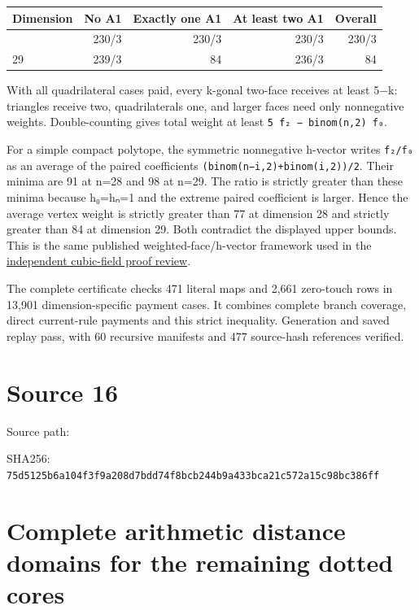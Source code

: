 \documentclass[
  10pt,
]{report}
\newcounter{none} %
\begin{document}
{\def\LTcaptype{none} %
\begin{longtable}[]{@{}lrrrr@{}}
\toprule\noalign{}
Dimension & No A1 & Exactly one A1 & At least two A1 & Overall \\
\midrule\noalign{}
\endhead
\bottomrule\noalign{}
\endlastfoot
28 & 230/3 & 230/3 & 230/3 & 230/3 \\
29 & 239/3 & 84 & 236/3 & 84 \\
\end{longtable}
}

With all quadrilateral cases paid, every k-gonal two-face receives at
least 5−k: triangles receive two, quadrilaterals one, and larger faces
need only nonnegative weights. Double-counting gives total weight at
least \texttt{5\ f₂\ −\ binom(n,2)\ f₀}.

For a simple compact polytope, the symmetric nonnegative h-vector writes
\texttt{f₂/f₀} as an average of the paired coefficients
\texttt{(binom(n−i,2)+binom(i,2))/2}. Their minima are 91 at n=28 and 98
at n=29. The ratio is strictly greater than these minima because h₀=hₙ=1
and the extreme paired coefficient is larger. Hence the average vertex
weight is strictly greater than 77 at dimension 28 and strictly greater
than 84 at dimension 29. Both contradict the displayed upper bounds.
This is the same published weighted-face/h-vector framework used in the
\href{fresh_compact_global_bound_20261015_review.md}{independent
cubic-field proof review}.

The complete certificate checks 471 literal maps and 2,661 zero-touch
rows in 13,901 dimension-specific payment cases. It combines complete
branch coverage, direct current-rule payments and this strict
inequality. Generation and saved replay pass, with 60 recursive
manifests and 477 source-hash references verified.

\clearpage

\chapter{Source 16}\label{source-16}

Source path: 

SHA256:
\nolinkurl{75d5125b6a104f3f9a208d7bdd74f8bcb244b9a433bca21c572a15c98bc386ff}

\chapter{Complete arithmetic distance domains for the remaining dotted
cores}\label{complete-arithmetic-distance-domains-for-the-remaining-dotted-cores}
\end{document}
